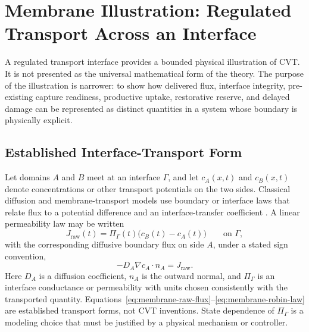 
\section{Membrane Illustration: Regulated Transport Across an Interface}
\label{sec:membrane}

A regulated transport interface provides a bounded physical illustration of CVT. It is not presented as the universal mathematical form of the theory. The purpose of the illustration is narrower: to show how delivered flux, interface integrity, pre-existing capture readiness, productive uptake, restorative reserve, and delayed damage can be represented as distinct quantities in a system whose boundary is physically explicit.

\subsection{Established Interface-Transport Form}

Let domains \(A\) and \(B\) meet at an interface \(\Gamma\), and let \(c_A(x,t)\) and \(c_B(x,t)\) denote concentrations or other transport potentials on the two sides. Classical diffusion and membrane-transport models use boundary or interface laws that relate flux to a potential difference and an interface-transfer coefficient \cite{crank1975,kedem1958}. A linear permeability law may be written
\begin{equation}
    J_{\mathrm{raw}}(t)
    =
    \Pi_{\Gamma}(t)
    \bigl(c_B(t)-c_A(t)\bigr)
    \qquad \text{on }\Gamma,
    \label{eq:membrane-raw-flux}
\end{equation}
with the corresponding diffusive boundary flux on side \(A\), under a stated sign convention,
\begin{equation}
    -D_A\nabla c_A\cdot n_A
    =
    J_{\mathrm{raw}}.
    \label{eq:membrane-robin-law}
\end{equation}
Here \(D_A\) is a diffusion coefficient, \(n_A\) is the outward normal, and \(\Pi_{\Gamma}\) is an interface conductance or permeability with units chosen consistently with the transported quantity. Equations~\eqref{eq:membrane-raw-flux}--\eqref{eq:membrane-robin-law} are established transport forms, not CVT inventions. State dependence of \(\Pi_{\Gamma}\) is a modeling choice that must be justified by a physical mechanism or controller.

